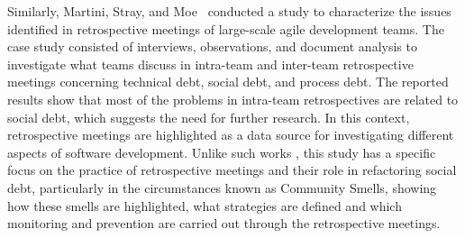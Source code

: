 Similarly, Martini, Stray, and Moe~\cite{martini2019} conducted a study to characterize the issues identified in retrospective meetings of large-scale agile development teams. The case study consisted of interviews, observations, and document analysis to investigate what teams discuss in intra-team and inter-team retrospective meetings concerning technical debt, social debt, and process debt. The reported results show that most of the problems in intra-team retrospectives are related to social debt, which suggests the need for further research.
In this context, retrospective meetings are highlighted as a data source for investigating different aspects of software development. Unlike such works \cite{martini2019, law2005, mchugh2012, muller2021, dingsoyr2018}, this study has a specific focus on the practice of retrospective meetings and their role in refactoring social debt, particularly in the circumstances known as Community Smells, showing how these smells are highlighted, what strategies are defined and which monitoring and prevention are carried out through the retrospective meetings.